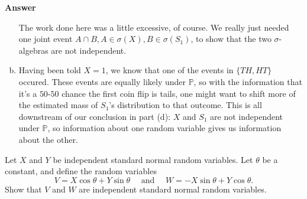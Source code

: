 \documentclass[11pt]{article}
\renewcommand\P{\mathbb{P}} %
\newcounter{question}[section]
\newenvironment{hwanswer}
    {
        \vspace{2mm}
        {\bfseries Answer}
        \vspace{-\abovedisplayskip}
        \begin{center}
            \begin{tcolorbox}[
                width=0.95\textwidth,
                colback=white,
                colframe=white,
                opacityback=0,
                opacityframe=0,
                boxrule=0pt,
                frame hidden,
                breakable,
                before upper={\parindent15pt} %
            ]
            \lineskip=0pt %
    }
    {
        \end{tcolorbox}
        \end{center}
        \vspace{4mm}
    }
\begin{document}
\begin{hwanswer}
\begin{enumerate}[(a)]
            The work done here was a little excessive, of course. We really just needed
            one joint event $A \cap B, A \in \sigma(X), B \in \sigma(S_1)$, to show that
            the two $\sigma$-algebras are not independent.

            \item Having been told $X = 1$, we know that one of the events in $\{TH, HT\}$
            occured. These events are equally likely under $\P$, so with the information
            that it's a $50$-$50$ chance the first coin flip is tails, one might want to
            shift more of the estimated mass of $S_1$'s distribution to that outcome. This
            is all downstream of our conclusion in part (d): $X$ and $S_1$ are not
            independent under $\P$, so information about one random variable gives us
            information about the other.
        \end{enumerate}
    \end{hwanswer}





    \begin{hwquestion}
        Let $X$ and $Y$ be independent standard normal random variables. Let $\theta$ be a
        constant, and define the random variables
        \[
            V = X \cos \theta + Y \sin \theta
            \quad \text{ and } \quad
            W = -X\sin \theta + Y \cos \theta.
        \]
        Show that $V$ and $W$ are independent standard normal random variables.
    \end{hwquestion}
\end{document}
